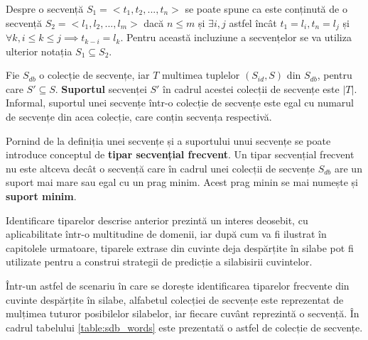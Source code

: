 Despre o secvență $S_1=<t_1, t_2, ...,t_n>$ se poate spune ca este conținută de o secvență $S_2=<l_1, l_2, ...,l_m>$ dacă $n \leq m$ și $ \exists i,j$ astfel încât $t_1 = l_i, t_n = l_j$ și $\forall k, i \leq k \leq j \implies t_{k-i} = l_k$. Pentru această incluziune a secvențelor se va utiliza ulterior notația $S_1 \subseteq S_2$.      
\begin{defi}

Fie $S_{db}$ o colecție de secvențe, iar $T$ multimea tuplelor $(S_{id}, S)$ din $S_{db}$, pentru care $S' \subseteq S$. \textbf{Suportul} secvenței $S'$ în cadrul acestei colecții de secvențe este $\vert T \vert$. Informal, suportul unei secvențe într-o colecție de secvențe este egal cu numarul de secvențe din acea colecție, care conțin secvența respectivă.
\end{defi}

Pornind de la definiția unei secvențe și a suportului unui secvențe se poate introduce conceptul de \textbf{tipar secvențial frecvent}. Un tipar secvențial frecvent nu este altceva decât o secvență care în cadrul unei colecții de secvențe $S_{db}$ are un suport mai mare sau egal cu un prag minim. Acest prag minin se mai numește și \textbf{suport minim}.

Identificare tiparelor descrise anterior prezintă un interes deosebit, cu aplicabilitate într-o multitudine de domenii, iar după cum va fi ilustrat în capitolele urmatoare, tiparele extrase din cuvinte deja despărțite în silabe pot fi utilizate pentru a construi strategii de predicție a silabisirii cuvintelor. 

\begin{ex}
Într-un astfel de scenariu în care se dorește identificarea tiparelor frecvente din cuvinte despărțite în silabe, alfabetul colecției de secvențe este reprezentat de mulțimea tuturor posibilelor silabelor, iar fiecare cuvânt reprezintă o secvență. În cadrul tabelului \ref{table:sdb_words} este prezentată o astfel de colecție de secvențe.
\end{ex}

